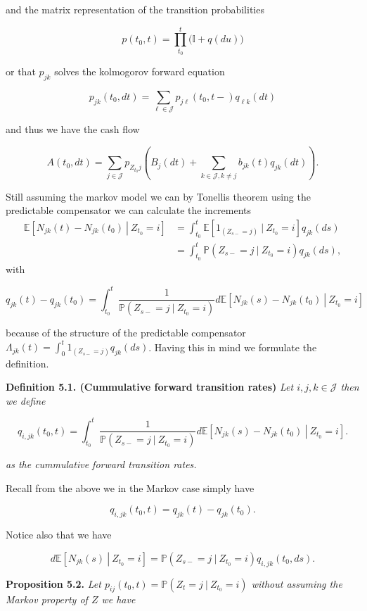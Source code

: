 \documentclass[a4paper,10pt,openany]{book}
\begin{document}
and the matrix representation of the transition probabilities

\[
p(t_0,t)=\prod_{t_0}^t\Big(\mathbb I + q(du)\Big)
\]

or that \(p_{jk}\) solves the kolmogorov forward equation

\[
p_{jk}(t_0,dt)=\sum_{\ell\in\mathcal J}p_{j\ell}(t_0,t-)q_{\ell k}(dt)
\]

and thus we have the cash flow

\[
A(t_0,dt)=\sum_{j\in\mathcal J}p_{Z_{t_0}j}\left(B_j(dt)+\sum_{k\in\mathcal J,k\ne j} b_{jk}(t)q_{jk}(dt)\right).
\]

Still assuming the markov model we can by Tonellis theorem using the predictable compensator we can calculate the increments
\begin{align*}
\mathbb E\left[\left.N_{jk}(t)-N_{jk}(t_0)\ \right\vert\ Z_{t_0}=i\right]&=\int_{t_0}^t \mathbb E[1_{(Z_{s-}=j)}\ \vert\ Z_{t_0}=i]q_{jk}(ds)\\
&=\int_{t_0}^t \mathbb P(Z_{s-}=j\ \vert\ Z_{t_0}=i)q_{jk}(ds),
\end{align*}
with

\[
q_{jk}(t)-q_{jk}(t_0)=\int_{t_0}^t\frac{1}{\mathbb P(Z_{s-}=j\ \vert\ Z_{t_0}=i)} d\mathbb E\left[\left.N_{jk}(s)-N_{jk}(t_0)\ \right\vert\ Z_{t_0}=i\right]
\]

because of the structure of the predictable compensator \(\Lambda_{jk}(t)=\int_0^t 1_{(Z_{s-}=j)} q_{jk}(ds)\). Having this in mind we formulate the definition.

\textbf{Definition 5.1. (Cummulative forward transition rates)} \emph{Let \(i,j,k\in\mathcal J\) then we define}

\[
q_{i,jk}(t_0,t)=\int_{t_0}^t\frac{1}{\mathbb P(Z_{s-}=j\ \vert\ Z_{t_0}=i)}d\mathbb E\left[\left.N_{jk}(s)-N_{jk}(t_0)\ \right\vert\ Z_{t_0}=i\right].
\]

\emph{as the cummulative forward transition rates.}

Recall from the above we in the Markov case simply have

\[
q_{i,jk}(t_0,t)=q_{jk}(t)-q_{jk}(t_0).
\]

Notice also that we have

\[
d\mathbb E\left[\left.N_{jk}(s)\ \right\vert\ Z_{t_0}=i\right]=\mathbb P (Z_{s-}=j\ \vert\ Z_{t_0}=i)q_{i,jk}(t_0,ds).
\]

\textbf{Proposition 5.2.} \emph{Let \(p_{ij}(t_0,t)=\mathbb P(Z_t=j\ \vert\ Z_{t_0}=i)\) without assuming the Markov property of \(Z\) we have}
\end{document}
